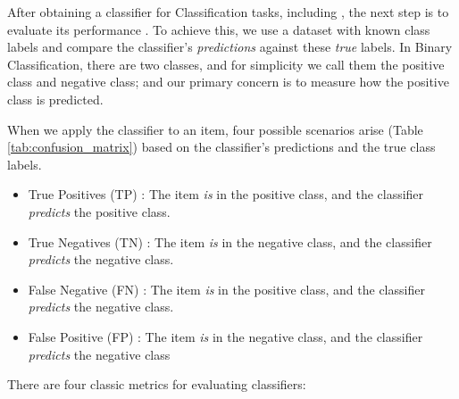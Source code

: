 \label{02_evaluation_metrics}

After obtaining a classifier for Classification tasks, including \textclassification{}, the next step is to evaluate its performance . To achieve this, we use a dataset with known class labels and compare the classifier's \emph{predictions} against these \emph{true} labels. In Binary Classification, there are two classes, and for simplicity we call them the  positive class and negative class; and our primary concern is to measure how the positive class is predicted.

When we apply the classifier to an item, four possible scenarios arise (Table \ref{tab:confusion_matrix}) based on the classifier's predictions and the true class labels.


\begin{minipage}{\textwidth}
\begin{itemize}
    \item True Positives (TP) : The item \emph{is} in the positive class, and the classifier \emph{predicts} the positive class.
    \item True Negatives (TN) : The item \emph{is} in the negative class, and the classifier \emph{predicts} the negative class.
    \item False Negative (FN) : The item \emph{is} in the positive class, and the classifier \emph{predicts} the negative class.
    \item False Positive (FP) : The item \emph{is} in the negative class, and the classifier \emph{predicts} the negative class
\end{itemize}
\end{minipage}



There are four classic metrics for evaluating classifiers:

